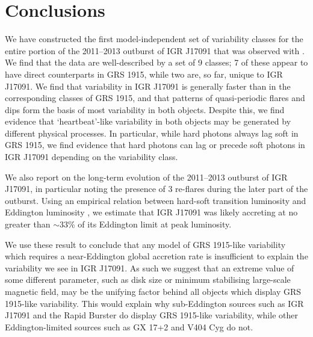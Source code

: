 \section{Conclusions}

\par We have constructed the first model-independent set of variability classes for the entire portion of the 2011--2013 outburst of IGR J17091 that was observed with \rxte .  We find that the data are well-described by a set of 9 classes;  7 of these appear to have direct counterparts in GRS 1915, while two are, so far, unique to IGR J17091.  We find that variability in IGR J17091 is generally faster than in the corresponding classes of GRS 1915, and that patterns of quasi-periodic flares and dips form the basis of most variability in both objects.  Despite this, we find evidence that `heartbeat'-like variability in both objects may be generated by different physical processes.  In particular, while hard photons always lag soft in GRS 1915, we find evidence that hard photons can lag or precede soft photons in IGR J17091 depending on the variability class.
\par We also report on the long-term evolution of the 2011--2013 outburst of IGR J17091, in particular noting the presence of 3 re-flares during the later part of the outburst.  Using an empirical relation between hard-soft transition luminosity and Eddington luminosity \citep{Maccarone_2pct}, we estimate that IGR J17091 was likely accreting at no greater than $\sim33$\% of its Eddington limit at peak luminosity.
\par We use these result to conclude that any model of GRS 1915-like variability which requires a near-Eddington global accretion rate is insufficient to explain the variability we see in IGR J17091.  As such we suggest that an extreme value of some different parameter, such as disk size or minimum stabilising large-scale magnetic field, may be the unifying factor behind all objects which display GRS 1915-like variability.  This would explain why sub-Eddington sources such as IGR J17091 and the Rapid Burster do display GRS 1915-like variability, while other Eddington-limited sources such as GX 17+2 and V404 Cyg do not.